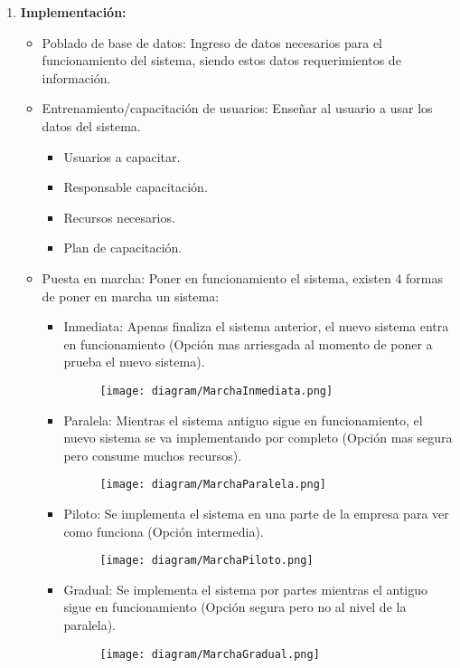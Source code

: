 \documentclass{templateNote}
\begin{document}
\begin{enumerate}
    \newpage
    \item \label{item:ImplCas} \hypertarget{I}{\textbf{Implementación:}} 
    \begin{itemize}
        \item Poblado de base de datos: Ingreso de datos necesarios para el funcionamiento del sistema, siendo estos datos requerimientos de información.
        \item Entrenamiento/capacitación de usuarios: Enseñar al usuario a usar los datos del sistema.
        \begin{itemize}
            \item Usuarios a capacitar.
            \item Responsable capacitación.
            \item Recursos necesarios.
            \item Plan de capacitación. 
        \end{itemize}
        \item Puesta en marcha: Poner en funcionamiento el sistema, existen 4 formas de poner en marcha un sistema:            
        \begin{itemize}
            \item Inmediata: Apenas finaliza el sistema anterior, el nuevo sistema entra en funcionamiento (Opción mas arriesgada al momento de poner a prueba el nuevo sistema).
            \begin{figure}[H]
                \centering
                \texttt{[image: diagram/MarchaInmediata.png]}
            \end{figure}
            \item Paralela: Mientras el sistema antiguo sigue en funcionamiento, el nuevo sistema se va implementando por completo (Opción mas segura pero consume muchos recursos).
            \begin{figure}[H]
                \centering
                \texttt{[image: diagram/MarchaParalela.png]}
            \end{figure}
            \item Piloto: Se implementa el sistema en una parte de la empresa para ver como funciona (Opción intermedia).
            \begin{figure}[H]
                \centering
                \texttt{[image: diagram/MarchaPiloto.png]}
            \end{figure}
            \item Gradual: Se implementa el sistema por partes mientras el antiguo sigue en funcionamiento (Opción segura pero no al nivel de la paralela).
            \begin{figure}[H]
                \centering
                \texttt{[image: diagram/MarchaGradual.png]}
            \end{figure}
        \end{itemize}
    \end{itemize}


\end{enumerate}
\end{document}
